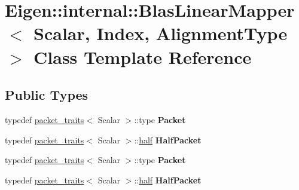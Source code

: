 \hypertarget{class_eigen_1_1internal_1_1_blas_linear_mapper}{}\section{Eigen\+:\+:internal\+:\+:Blas\+Linear\+Mapper$<$ Scalar, Index, Alignment\+Type $>$ Class Template Reference}
\label{class_eigen_1_1internal_1_1_blas_linear_mapper}
\subsection*{Public Types}
\begin{DoxyCompactItemize}
\item 
\mbox{\label{class_eigen_1_1internal_1_1_blas_linear_mapper_a2da71f30432ab284eb782baaf9e77b9a}} 
typedef \hyperlink{struct_eigen_1_1internal_1_1packet__traits}{packet\+\_\+traits}$<$ Scalar $>$\+::type {\bfseries Packet}
\item 
\mbox{\label{class_eigen_1_1internal_1_1_blas_linear_mapper_ab6cc925c0e7b005f5b0cfd435b37c09d}} 
typedef \hyperlink{struct_eigen_1_1internal_1_1packet__traits}{packet\+\_\+traits}$<$ Scalar $>$\+::\hyperlink{struct_eigen_1_1half}{half} {\bfseries Half\+Packet}
\item 
\mbox{\label{class_eigen_1_1internal_1_1_blas_linear_mapper_a2da71f30432ab284eb782baaf9e77b9a}} 
typedef \hyperlink{struct_eigen_1_1internal_1_1packet__traits}{packet\+\_\+traits}$<$ Scalar $>$\+::type {\bfseries Packet}
\item 
\mbox{\label{class_eigen_1_1internal_1_1_blas_linear_mapper_ab6cc925c0e7b005f5b0cfd435b37c09d}} 
typedef \hyperlink{struct_eigen_1_1internal_1_1packet__traits}{packet\+\_\+traits}$<$ Scalar $>$\+::\hyperlink{struct_eigen_1_1half}{half} {\bfseries Half\+Packet}
\end{DoxyCompactItemize}
